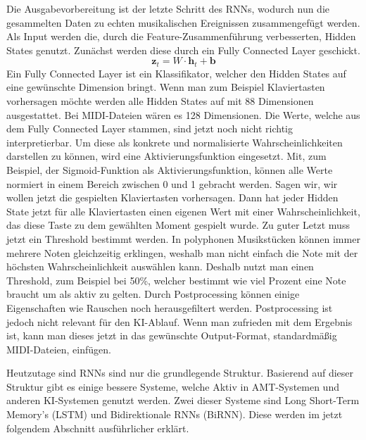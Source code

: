 Die Ausgabevorbereitung ist der letzte Schritt des RNNs,
wodurch nun die gesammelten Daten zu echten musikalischen Ereignissen zusammengefügt werden.
Als Input werden die, durch die Feature-Zusammenführung verbesserten, Hidden States genutzt.
Zunächst werden diese durch ein Fully Connected Layer geschickt.
\[
\mathbf{z}_t = W \cdot \mathbf{h}_t + \mathbf{b}
\]
Ein Fully Connected Layer ist ein Klassifikator, welcher den Hidden States auf eine gewünschte Dimension bringt.
Wenn man zum Beispiel Klaviertasten vorhersagen möchte werden alle Hidden States auf mit 88 Dimensionen ausgestattet.
Bei MIDI-Dateien wären es 128 Dimensionen.
Die Werte, welche aus dem Fully Connected Layer stammen, sind jetzt noch nicht richtig interpretierbar.
Um diese als konkrete und normalisierte Wahrscheinlichkeiten darstellen zu können,
wird eine Aktivierungsfunktion eingesetzt.
Mit, zum Beispiel, der Sigmoid-Funktion als Aktivierungsfunktion,
können alle Werte normiert in einem Bereich zwischen 0 und 1 gebracht werden.
Sagen wir, wir wollen jetzt die gespielten Klaviertasten vorhersagen.
Dann hat jeder Hidden State jetzt für alle Klaviertasten einen eigenen Wert mit einer Wahrscheinlichkeit,
das diese Taste zu dem gewählten Moment gespielt wurde.
Zu guter Letzt muss jetzt ein Threshold bestimmt werden.
In polyphonen Musikstücken können immer mehrere Noten gleichzeitig erklingen,
weshalb man nicht einfach die Note mit der höchsten Wahrscheinlichkeit auswählen kann.
Deshalb nutzt man einen Threshold, zum Beispiel bei 50\%,
welcher bestimmt wie viel Prozent eine Note braucht um als aktiv zu gelten.
Durch Postprocessing können einige Eigenschaften wie Rauschen noch herausgefiltert werden.
Postprocessing ist jedoch nicht relevant für den KI-Ablauf.
Wenn man zufrieden mit dem Ergebnis ist, kann man dieses jetzt in das gewünschte Output-Format,
standardmäßig MIDI-Dateien, einfügen.

Heutzutage sind RNNs sind nur die grundlegende Struktur.
Basierend auf dieser Struktur gibt es einige bessere Systeme,
welche Aktiv in AMT-Systemen und anderen KI-Systemen genutzt werden.
Zwei dieser Systeme sind Long Short-Term Memory's (LSTM) und Bidirektionale RNNs (BiRNN).
Diese werden im jetzt folgendem Abschnitt ausführlicher erklärt.

